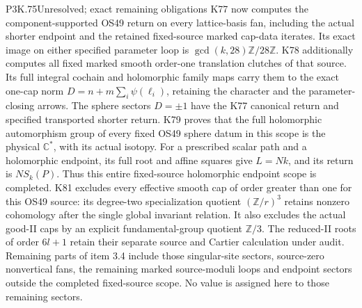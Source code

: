 \begin{statement}{P3K.75}{Unresolved; exact remaining obligations}
K77 now computes the component-supported OS49 return on every
lattice-basis fan, including the actual shorter endpoint and
the retained fixed-source marked cap-data iterates. Its exact
image on either specified parameter loop is
\(\gcd(k,28)\mathbb Z/28\mathbb Z\).
K78 additionally computes all fixed marked smooth order-one
translation clutches of that source. Its full integral cochain
and holomorphic family maps carry them to the exact one-cap norm
\(D=n+m\sum_i\psi(\ell_i)\), retaining the character and the
parameter-closing arrows. The sphere sectors \(D=\pm1\) have the
K77 canonical return and specified transported shorter return.
K79 proves that the full holomorphic automorphism group of every
fixed OS49 sphere datum in this scope is the physical
\(\mathbb C^*\), with its actual isotopy. For a prescribed scalar
path and a holomorphic endpoint, its full root and affine squares
give \(L=Nk\), and its return is \(N S_k(P)\). Thus this entire
fixed-source holomorphic endpoint scope is completed.
K81 excludes every effective smooth cap of order greater than
one for this OS49 source: its degree-two specialization quotient
\((\mathbb Z/r)^3\) retains nonzero cohomology after the single
global invariant relation. It also excludes the actual good-II
caps by an explicit fundamental-group quotient \(\mathbb Z/3\).
The reduced-II roots of order \(6l+1\) retain their separate
source and Cartier calculation under audit. Remaining parts of
item 3.4 include those singular-site sectors, source-zero
nonvertical fans, the remaining marked source-moduli loops and
endpoint sectors outside the completed fixed-source scope.
No value is assigned here to those remaining sectors.
\end{statement}
